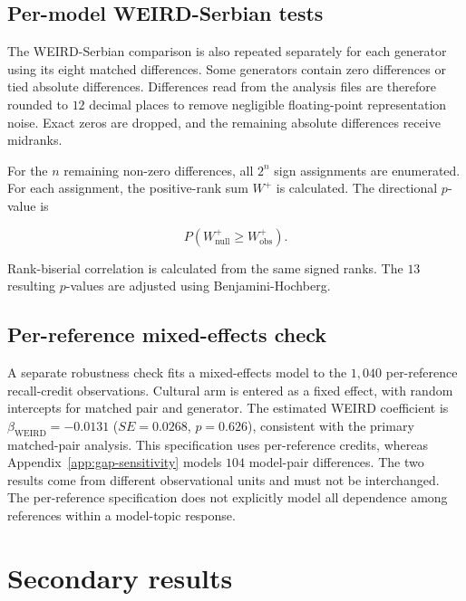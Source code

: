 \documentclass[11pt,a4paper]{article}
\begin{document}
\subsection{Per-model WEIRD-Serbian tests}
\label{app:per_model_tests}

The WEIRD-Serbian comparison is also repeated separately for each generator using its eight matched differences. Some generators contain zero differences or tied absolute differences. Differences read from the analysis files are therefore rounded to $12$ decimal places to remove negligible floating-point representation noise. Exact zeros are dropped, and the remaining absolute differences receive midranks.

For the $n$ remaining non-zero differences, all $2^n$ sign assignments are enumerated. For each assignment, the positive-rank sum $W^+$ is calculated. The directional $p$-value is

\begin{equation}
 P\left(W^+_{\mathrm{null}}\geq W^+_{\mathrm{obs}}\right).
\end{equation}

Rank-biserial correlation is calculated from the same signed ranks. The $13$ resulting $p$-values are adjusted using Benjamini-Hochberg.

\subsection{Per-reference mixed-effects check}
\label{app:mixed_model}

A separate robustness check fits a mixed-effects model to the $1,040$ per-reference recall-credit observations. Cultural arm is entered as a fixed effect, with random intercepts for matched pair and generator. The estimated WEIRD coefficient is $\beta_{\mathrm{WEIRD}}=-0.0131$ ($SE=0.0268$, $p=0.626$), consistent with the primary matched-pair analysis. This specification uses per-reference credits, whereas Appendix~\ref{app:gap-sensitivity} models $104$ model-pair differences. The two results come from different observational units and must not be interchanged. The per-reference specification does not explicitly model all dependence among references within a model-topic response.

\section{Secondary results}
\label{app:secondary_results}
\end{document}
